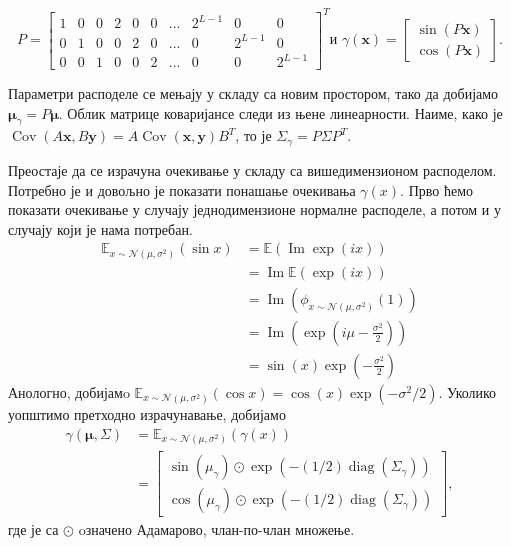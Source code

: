 \documentclass[12pt, a4paper, twoside]{book}
\numberwithin{equation}{chapter}
\numberwithin{theorem}{section}
\numberwithin{definition}{section}
\numberwithin{definitionChapter}{chapter}
\begin{document}
\begin{equation}
		P =
		\begin{bmatrix}
			1 & 0 & 0 & 2 & 0 & 0 & ... & 2^{L-1} & 0 & 0 \\
			0 & 1 & 0 & 0 & 2 & 0 & ... & 0 & 2^{L-1} & 0 \\
			0 & 0 & 1 & 0 & 0 & 2 & ... & 0 & 0 & 2^{L-1}
		\end{bmatrix}^T \text{и }
		\gamma(\mathbf{x}) =
		\begin{bmatrix}
			\sin(P\mathbf{x}) \\
			\cos(P\mathbf{x})
		\end{bmatrix}.
\end{equation}

Параметри расподеле се мењају у складу са новим простором, тако да добијамо
$\boldsymbol{\mu}_\gamma = P\boldsymbol{\mu}$. Облик матрице коваријансе следи из њене линеарности.
Наиме, како је $\operatorname{Cov}(A\mathbf{x}, B\mathbf{y}) = A\operatorname{Cov}(\mathbf{x}, \mathbf{y})B^T$,
то је $\Sigma_\gamma = P\Sigma P^T$.

Преостаје да се израчуна очекивање у складу са вишедимензионом расподелом. Потребно је и довољно је показати
понашање очекивања $\gamma(x)$. Прво ћемо показати очекивање у случају једнодимензионе нормалне расподеле, а
потом и у случају који је нама потребан.
\begin{equation}
	\begin{split}
		\mathbb{E}_{x \sim \mathcal{N}(\mu, \sigma^2)}(\sin x) & = \mathbb{E}(\operatorname{Im}\exp(ix)) \\
			& = \operatorname{Im}\mathbb{E}(\exp(ix)) \\
			& = \operatorname{Im}(\phi_{x \sim \mathcal{N}(\mu, \sigma^2)}(1)) \\
			& = \operatorname{Im}\left(\exp\left(i\mu - \frac{\sigma^2}{2}\right)\right) \\
			& = \sin(x)\exp\left(-\frac{\sigma^2}{2}\right)
	\end{split}
\end{equation}
Анологно, добијамo $\mathbb{E}_{x \sim \mathcal{N}(\mu, \sigma^2)}(\cos x) = \cos(x)\exp\left(-\sigma^2/2\right)$.
Уколико уопштимо претходно израчунавање, добијамо
\begin{equation}
	\begin{split}
		\gamma(\boldsymbol{\mu}, \Sigma) & = \mathbb{E}_{x \sim \mathcal{N}(\mu, \sigma^2)}(\gamma(x)) \\
			& =
			\begin{bmatrix}
				\sin(\mu_\gamma) \odot \exp(-(1/2)\operatorname{diag}(\Sigma_\gamma)) \\
				\cos(\mu_\gamma) \odot \exp(-(1/2)\operatorname{diag}(\Sigma_\gamma))
			\end{bmatrix},
	\end{split}
\end{equation}
где је са $\odot$ oзначено Адамарово, члан-по-члан множење.
\end{document}
